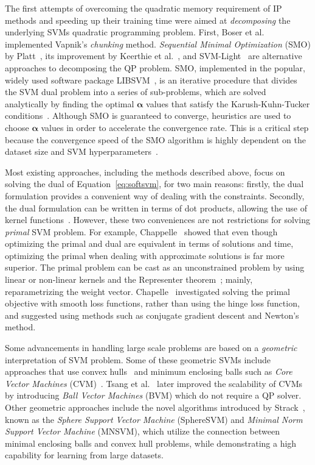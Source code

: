 \documentclass[reqno]{vcuthesis}
\numberwithin{equation}{chapter}
\begin{document}
The first attempts of overcoming the quadratic memory requirement of IP methods and speeding up their training time were aimed at \textit{decomposing} the underlying SVMs quadratic programming problem. First, Boser et al.~\cite{boser1992training} implemented Vapnik's \textit{chunking} method. \textit{Sequential Minimal Optimization} (SMO) by Platt~\cite{Platt1998}, its improvement by Keerthie et al.~\cite{keerthi2001improvements}, and SVM-Light~\cite{Joachims1999} are alternative approaches to decomposing the QP problem. SMO, implemented in the popular, widely used software package LIBSVM~\cite{CC01a}, is an iterative procedure that divides the SVM dual problem into a series of sub-problems, which are solved analytically by finding the optimal $\bm \alpha$ values that satisfy the Karush-Kuhn-Tucker conditions~\cite{Boyd2004}. Although SMO is guaranteed to converge, heuristics are used to choose $\bm \alpha$ values in order to accelerate the convergence rate. This is a critical step because the convergence speed of the SMO algorithm is highly dependent on the dataset size and SVM hyperparameters~\cite{Schoelkopf2002}.

Most existing approaches, including the methods described above, focus on solving the dual of Equation~\ref{eq:softsvm}, for two main reasons: firstly, the dual formulation provides a convenient way of dealing with the constraints. Secondly, the dual formulation can be written in terms of dot products, allowing the use of kernel functions~\cite{bottou2007large}. However, these two conveniences are not restrictions for solving \textit{primal} SVM problem. For example, Chappelle~\cite{Chapelle2007} showed that even though optimizing the primal and dual are equivalent in terms of solutions and time, optimizing the primal when dealing with approximate solutions is far more superior. The primal problem can be cast as an unconstrained problem by using linear or non-linear kernels and the Representer theorem~\cite{scholkopf2001generalized}; mainly, reparametrizing the weight vector. Chapelle~\cite{Chapelle2007} investigated solving the primal objective with smooth loss functions, rather than using the hinge loss function, and suggested using methods such as conjugate gradient descent and Newton's method.

Some advancements in handling large scale problems are based on a \textit{geometric} interpretation of SVM problem. Some of these geometric SVMs include approaches that use convex hulls~\cite{bennett2000duality} and minimum enclosing balls such as \textit{Core Vector Machines} (CVM)~\cite{tsang2005core}. Tsang et al.~\cite{tsang2007simpler} later improved the scalability of CVMs by introducing \textit{Ball Vector Machines} (BVM) which do not require a QP solver. Other geometric approaches include the novel algorithms introduced by Strack~\cite{strack2013geometric}, known as the \textit{Sphere Support Vector Machine} (SphereSVM) and \textit{Minimal Norm Support Vector Machine} (MNSVM), which utilize the connection between minimal enclosing balls and convex hull problems, while demonstrating a high capability for learning from large datasets. 
\end{document}
